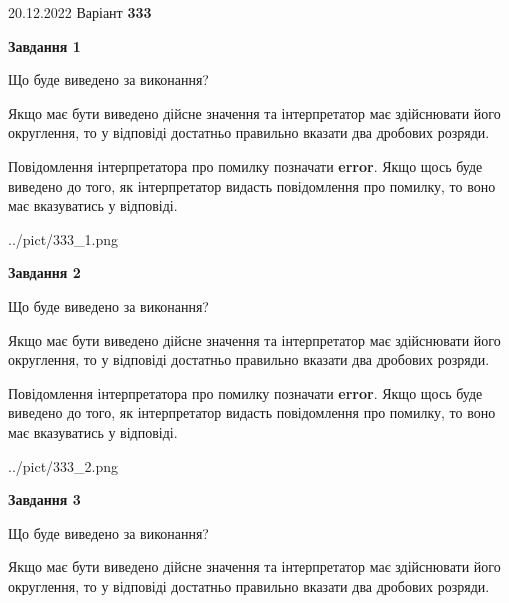 \documentclass[12pt, ukrainian]{article}
\begin{document}
{20.12.2022 Варіант \No \textbf { 333 }\par}
{
\begin {Large}

{\begin {center}\textbf{Завдання 1}\end {center}}\par
Що буде виведено за виконання? \par

Якщо має бути виведено дійсне значення та інтерпретатор має здійснювати його округлення, 
то у відповіді достатньо правильно вказати два дробових розряди.

Повідомлення інтерпретатора про помилку позначати \textbf{error}.
Якщо щось буде виведено до того, як інтерпретатор видасть повідомлення про помилку, 
то воно має вказуватись у відповіді. \par

\begin{center}
	{../pict/333_1.png}
\end{center}
\newpage

{\begin {center}\textbf{Завдання 2}\end {center}}\par
Що буде виведено за виконання? \par

Якщо має бути виведено дійсне значення та інтерпретатор має здійснювати його округлення, 
то у відповіді достатньо правильно вказати два дробових розряди.

Повідомлення інтерпретатора про помилку позначати \textbf{error}.
Якщо щось буде виведено до того, як інтерпретатор видасть повідомлення про помилку, 
то воно має вказуватись у відповіді. \par

\begin{center}
	{../pict/333_2.png}
\end{center}
\newpage

{\begin {center}\textbf{Завдання 3}\end {center}}\par
Що буде виведено за виконання? \par

Якщо має бути виведено дійсне значення та інтерпретатор має здійснювати його округлення, 
то у відповіді достатньо правильно вказати два дробових розряди.


\end{Large}}
\end{document}
